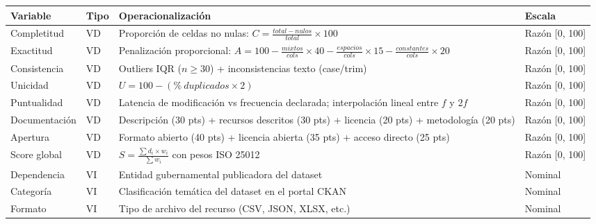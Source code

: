 \documentclass[12pt,letterpaper]{article}
\begin{document}
\begin{center}
\label{tab:variables}
\begin{tabular}{p{3cm}p{1.8cm}p{6.5cm}p{2cm}}
\toprule
\textbf{Variable} & \textbf{Tipo} & \textbf{Operacionalización} & \textbf{Escala} \\
\midrule

Completitud & VD & Proporción de celdas no nulas: $C = \frac{total - nulos}{total} \times 100$ & Razón [0, 100] \\[6pt]

Exactitud & VD & Penalización proporcional: $A = 100 - \frac{mixtos}{cols} \times 40 - \frac{espacios}{cols} \times 15 - \frac{constantes}{cols} \times 20$ & Razón [0, 100] \\[6pt]

Consistencia & VD & Outliers IQR ($n \geq 30$) + inconsistencias texto (case/trim) & Razón [0, 100] \\[6pt]

Unicidad & VD & $U = 100 - (\%\ duplicados \times 2)$ & Razón [0, 100] \\[6pt]

Puntualidad & VD & Latencia de modificación vs frecuencia declarada; interpolación lineal entre $f$ y $2f$ & Razón [0, 100] \\[6pt]

Documentación & VD & Descripción (30 pts) + recursos descritos (30 pts) + licencia (20 pts) + metodología (20 pts) & Razón [0, 100] \\[6pt]

Apertura & VD & Formato abierto (40 pts) + licencia abierta (35 pts) + acceso directo (25 pts) & Razón [0, 100] \\[6pt]

Score global & VD & $S = \frac{\sum d_i \times w_i}{\sum w_i}$ con pesos ISO 25012 & Razón [0, 100] \\[6pt]

Dependencia & VI & Entidad gubernamental publicadora del dataset & Nominal \\[6pt]

Categoría & VI & Clasificación temática del dataset en el portal CKAN & Nominal \\[6pt]

Formato & VI & Tipo de archivo del recurso (CSV, JSON, XLSX, etc.) & Nominal \\

\bottomrule
\end{tabular}
\end{center}
\end{document}
